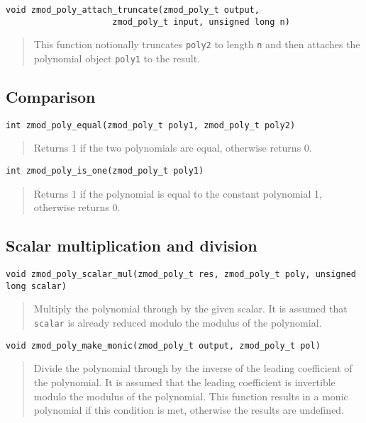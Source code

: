 \documentclass[a4paper,10pt]{article}
\newcommand{\code}{\lstinline}
\begin{document}
\begin{lstlisting}
void zmod_poly_attach_truncate(zmod_poly_t output, 
                     zmod_poly_t input, unsigned long n)
\end{lstlisting}
\begin{quote}
This function notionally truncates \code{poly2} to length \code{n} and then attaches the polynomial object \code{poly1} to the result.
\end{quote}

\subsection{Comparison}
\begin{lstlisting}
int zmod_poly_equal(zmod_poly_t poly1, zmod_poly_t poly2)
\end{lstlisting}
\begin{quote}
Returns 1 if the two polynomials are equal, otherwise returns 0.
\end{quote}

\begin{lstlisting}
int zmod_poly_is_one(zmod_poly_t poly1)
\end{lstlisting}
\begin{quote}
Returns 1 if the polynomial is equal to the constant polynomial 1, otherwise returns 0.
\end{quote}

\subsection{Scalar multiplication and division}
\begin{lstlisting}
void zmod_poly_scalar_mul(zmod_poly_t res, zmod_poly_t poly, unsigned long scalar)
\end{lstlisting}
\begin{quote}
Multiply the polynomial through by the given scalar. It is assumed that \code{scalar} is already reduced modulo the modulus of the polynomial.
\end{quote}

\begin{lstlisting}
void zmod_poly_make_monic(zmod_poly_t output, zmod_poly_t pol)
\end{lstlisting}
\begin{quote}
Divide the polynomial through by the inverse of the leading coefficient of the polynomial. It is assumed that the leading coefficient is invertible modulo the modulus of the polynomial. This function results in a monic polynomial if this condition is met, otherwise the results are undefined.
\end{quote}
\end{document}
